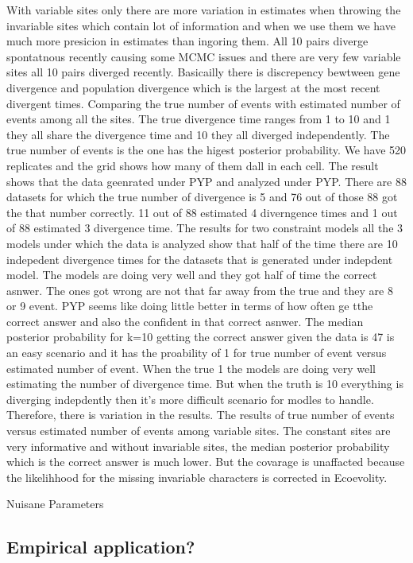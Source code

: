 With variable sites only there are more variation in estimates when throwing the invariable 
sites which contain lot of information and when we use them we have much more presicion in estimates
than ingoring them. All 10 pairs diverge spontatnous recently causing some MCMC issues and there 
are very few variable sites all 10 pairs diverged recently. Basicailly there is discrepency bewtween 
gene divergence and population divergence which is the largest at the most recent divergent times.
Comparing the true number of events with estimated number of events among all the sites. The true 
divergence time ranges from 1 to 10 and 1 they all share the divergence time and 10 they all 
diverged independently. The true number of events is the one has the higest posterior probability.
We have 520 replicates and the grid shows how many of them dall in each cell. The result shows 
that the data geenrated under PYP and analyzed under PYP. There are 88 datasets for which the true 
number of divergence is 5 and 76 out of those 88 got the that number correctly. 11 out of 88 
estimated 4 diverngence times and 1 out of 88 estimated 3 divergence time. 
The results for two constraint models all the 3 models under which the data is analyzed show that 
half of the time there are 10 indepedent divergence times for the datasets that is generated under 
indepdent model. The models are doing very well and they got half of time the correct asnwer. The 
ones got wrong are not that far away from the true and they are 8 or 9 event. PYP seems like 
doing little better in terms of how often ge tthe correct answer and also the confident in that 
correct asnwer. The median posterior probability for k=10 getting the correct answer
given the data is 47%
is an easy scenario and it has the proability of 1 for true number of event versus estimated number of 
event. When the true 1 the models are doing very well estimating the number of divergence time. But 
when the truth is 10 everything is diverging indepdently then it's more difficult scenario for 
modles to handle. Therefore, there is variation in the results. 
The results of true number of events versus estimated number of events among variable sites. The
constant sites are very informative and without invariable sites, the median posterior probability
which is the correct answer is much lower. But the covarage is unaffacted because the 
likelihhood for the missing invariable characters is corrected in Ecoevolity. 



  
 
   
  


Nuisane Parameters


\subsection{Empirical application?}
